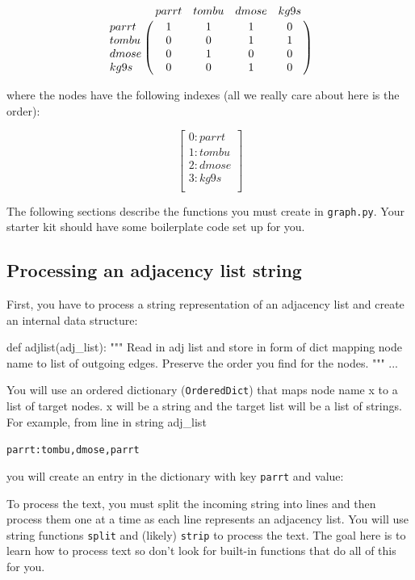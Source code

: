 \begin{fullwidth}
\[
\bordermatrix{
~ & parrt & tombu & dmose & kg9s \cr
parrt & 1 & 1 & 1 & 0\cr
tombu & 0 & 0 & 1 & 1 \cr
dmose & 0 & 1 & 0 & 0 \cr
kg9s & 0 & 0 & 1 & 0\cr
}
\]

\noindent where the nodes have the following indexes (all we really care about here is the order):
 
\[
\left[
\begin{array}{c}
0: parrt \\
1: tombu \\
2: dmose \\
3: kg9s \\
\end{array}
\right]
\]

The following sections describe the functions you must create in {\tt graph.py}. Your starter kit should have some boilerplate code set up for you.

\subsection{Processing an adjacency list string}

First, you have to process a string representation of an adjacency list and create an internal data structure:

\begin{pyverbatim}
def adjlist(adj_list):
    """
    Read in adj list and store in form of dict mapping node
    name to list of outgoing edges. Preserve the order you find
    for the nodes.
    """
    ...
\end{pyverbatim}

You will use an ordered dictionary ({\tt OrderedDict}) that maps node name x to a list of target nodes. x will be a string and the target list will be a list of strings. For example, from line in string adj\_list

\begin{alltt}
parrt: tombu, dmose, parrt
\end{alltt}

\noindent you will create an entry in the dictionary with key {\tt parrt} and value:

\begin{pyverbatim}
\end{pyverbatim}

\noindent To process the text, you must split the incoming string into lines and then process them one at a time as each line represents an adjacency list. You will use string functions {\tt split} and (likely) {\tt strip} to process the text. The goal here is to learn how to process text so don't look for built-in functions that do all of this for you.


\end{fullwidth}
